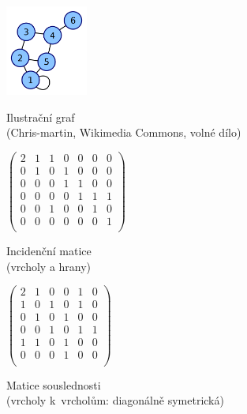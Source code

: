 \begin{figure}[ht!]
    \centering
    \begin{minipage}{0.20\textwidth}
        \centering
        \includegraphics[height=8em]{images/3_graf-matice-souslednosti}
        \caption[Ilustrační graf]{Ilustrační graf\\{\small (Chris-martin, Wikimedia Commons, volné dílo)}}
        \label{ilustracni-graf-matice}
    \end{minipage}%
    \begin{minipage}{0.4\textwidth}
        \centering
        $\left( \begin{matrix}
        2 & 1 & 1 & 0 & 0 & 0 & 0 \\
        0 & 1 & 0 & 1 & 0 & 0 & 0 \\
        0 & 0 & 0 & 1 & 1 & 0 & 0 \\
        0 & 0 & 0 & 0 & 1 & 1 & 1 \\
        0 & 0 & 1 & 0 & 0 & 1 & 0 \\
        0 & 0 & 0 & 0 & 0 & 0 & 1 \\
        \end{matrix} \right)$ 
        \caption[Incidenční matice]{Incidenční matice\\(vrcholy a hrany)}
    \end{minipage}%
    \begin{minipage}{0.4\textwidth}
        \centering
        $\left( \begin{matrix}
        2 & 1 & 0 & 0 & 1 & 0 \\
        1 & 0 & 1 & 0 & 1 & 0 \\
        0 & 1 & 0 & 1 & 0 & 0 \\
        0 & 0 & 1 & 0 & 1 & 1 \\
        1 & 1 & 0 & 1 & 0 & 0 \\
        0 & 0 & 0 & 1 & 0 & 0 \\
        \end{matrix} \right)$
        \caption[Matice souslednosti]{Matice souslednosti\\(vrcholy k~vrcholům: diagonálně symetrická)}
    \end{minipage}
\end{figure}
\FloatBarrier


